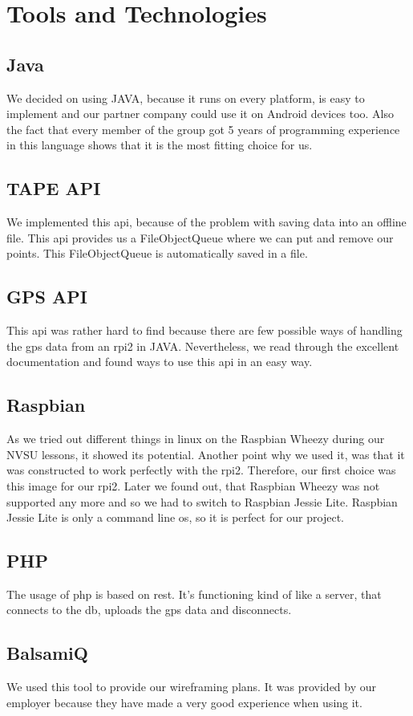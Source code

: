 \chapter{Tools and Technologies}
\section{Java}
We decided on using JAVA, because it runs on every platform, is easy to implement and our partner company could use it on Android devices too. Also the fact that every member of the group got 5 years of programming experience in this language shows that it is the most fitting choice for us.
\section{TAPE API}
We implemented this \gls{api}, because of the problem with saving data into an offline file. This \gls{api} provides us a FileObjectQueue where we can put and remove our points. This FileObjectQueue is automatically saved in a file.
\section{GPS API}
This \gls{api} was rather hard to find because there are few possible ways of handling the \gls{gps} data from an \gls{rpi2} in JAVA. Nevertheless, we read through the excellent documentation and found ways to use this \gls{api} in an easy way.
\section{Raspbian}
As we tried out different things in linux on the Raspbian Wheezy during our NVSU lessons, it showed its potential. Another point why we used it, was that it was constructed to work perfectly with the \gls{rpi2}. Therefore, our first choice was this image for our \gls{rpi2}. Later we found out, that Raspbian Wheezy was not supported any more and so we had to switch to Raspbian Jessie Lite. Raspbian Jessie Lite is only a command line \gls{os}, so it is perfect for our project.
\section{PHP}
The usage of \gls{php} is based on \gls{rest}. It's functioning kind of like a server, that connects to the \gls{db}, uploads the \gls{gps} data and disconnects.
\section{BalsamiQ}
We used this tool to provide our wireframing plans. It was provided by our employer because they have made a very good experience when using it.
